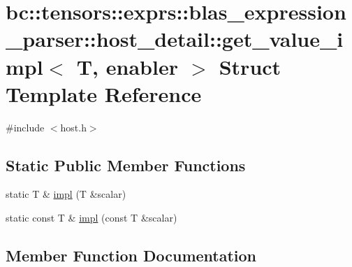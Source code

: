 \hypertarget{structbc_1_1tensors_1_1exprs_1_1blas__expression__parser_1_1host__detail_1_1get__value__impl}{}\section{bc\+:\+:tensors\+:\+:exprs\+:\+:blas\+\_\+expression\+\_\+parser\+:\+:host\+\_\+detail\+:\+:get\+\_\+value\+\_\+impl$<$ T, enabler $>$ Struct Template Reference}
\label{structbc_1_1tensors_1_1exprs_1_1blas__expression__parser_1_1host__detail_1_1get__value__impl}


{\ttfamily \#include $<$host.\+h$>$}

\subsection*{Static Public Member Functions}
\begin{DoxyCompactItemize}
\item 
static T \& \hyperlink{structbc_1_1tensors_1_1exprs_1_1blas__expression__parser_1_1host__detail_1_1get__value__impl_aa5af678c6bb5537d5680e8ee41b7a9e8}{impl} (T \&scalar)
\item 
static const T \& \hyperlink{structbc_1_1tensors_1_1exprs_1_1blas__expression__parser_1_1host__detail_1_1get__value__impl_ab561bce3439da0fa2385b239e6c8651a}{impl} (const T \&scalar)
\end{DoxyCompactItemize}


\subsection{Member Function Documentation}
\mbox{\label{structbc_1_1tensors_1_1exprs_1_1blas__expression__parser_1_1host__detail_1_1get__value__impl_aa5af678c6bb5537d5680e8ee41b7a9e8}} 
